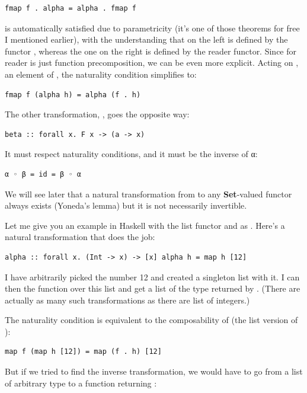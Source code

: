 \begin{Verbatim}[commandchars=\\\{\}]
fmap f . alpha = alpha . fmap f
\end{Verbatim}
is automatically satisfied due to parametricity (it's one of those
theorems for free I mentioned earlier), with the understanding that
 on the left is defined by the functor , whereas
the one on the right is defined by the reader functor. Since
 for reader is just function precomposition, we can be even
more explicit. Acting on , an element of ,
the naturality condition simplifies to:

\begin{Verbatim}[commandchars=\\\{\}]
fmap f (alpha h) = alpha (f . h)
\end{Verbatim}
The other transformation, , goes the opposite way:

\begin{Verbatim}[commandchars=\\\{\}]
beta :: forall x. F x -> (a -> x)
\end{Verbatim}
It must respect naturality conditions, and it must be the inverse of α:

\begin{Verbatim}[commandchars=\\\{\}]
α ◦ β = id = β ◦ α
\end{Verbatim}
We will see later that a natural transformation from 
to any \textbf{Set}-valued functor always exists (Yoneda's lemma) but it
is not necessarily invertible.

Let me give you an example in Haskell with the list functor and
 as . Here's a natural transformation that does
the job:

\begin{Verbatim}[commandchars=\\\{\}]
alpha :: forall x. (Int -> x) -> [x] alpha h = map h [12]
\end{Verbatim}
I have arbitrarily picked the number 12 and created a singleton list
with it. I can then  the function  over this list
and get a list of the type returned by . (There are actually
as many such transformations as there are list of integers.)

The naturality condition is equivalent to the composability of
 (the list version of ):

\begin{Verbatim}[commandchars=\\\{\}]
map f (map h [12]) = map (f . h) [12]
\end{Verbatim}
But if we tried to find the inverse transformation, we would have to go
from a list of arbitrary type  to a function returning
:

